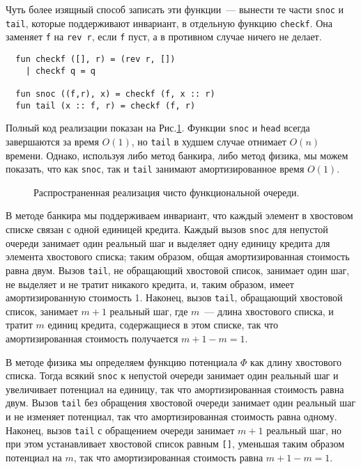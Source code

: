 Чуть более изящный способ записать эти функции~--- вынести те части
\lstinline!snoc! и \lstinline!tail!, которые поддерживают инвариант, в
отдельную функцию \lstinline!checkf!. Она заменяет \lstinline!f! на
\lstinline!rev r!, если \lstinline!f! пуст, а в противном случае
ничего не делает.
\begin{lstlisting}
  fun checkf ([], r) = (rev r, [])
    | checkf q = q

  fun snoc ((f,r), x) = checkf (f, x :: r)
  fun tail (x :: f, r) = checkf (f, r)
\end{lstlisting}
Полный код реализации показан на Рис.\ref{fig:5.2}. Функции
\lstinline!snoc! и \lstinline!head! всегда завершаются за время
$O(1)$, но \lstinline!tail! в худшем случае отнимает $O(n)$
времени. Однако, используя либо метод банкира, либо метод физика, мы
можем показать, что как \lstinline!snoc!, так и \lstinline!tail!
занимают амортизированное время $O(1)$.

\begin{figure}
  \centering
  
  \caption{Распространенная реализация чисто функциональной очереди.}
  \label{fig:5.2}
\end{figure}

В методе банкира мы поддерживаем инвариант, что каждый элемент в
хвостовом списке связан с одной единицей кредита. Каждый вызов
\lstinline!snoc! для непустой очереди занимает один реальный шаг и
выделяет одну единицу кредита для элемента хвостового списка; таким
образом, общая амортизированная стоимость равна двум. Вызов
\lstinline!tail!, не обращающий хвостовой список, занимает один шаг,
не выделяет и не тратит никакого кредита, и, таким образом, имеет
амортизированную стоимость 1. Наконец, вызов \lstinline!tail!,
обращающий хвостовой список, занимает $m+1$ реальный шаг, где $m$~---
длина хвостового списка, и тратит $m$ единиц кредита, содержащиеся в
этом списке, так что амортизированная стоимость получается $m + 1 - m
= 1$.

В методе физика мы определяем функцию потенциала $\Phi$ как длину
хвостового списка. Тогда всякий \lstinline!snoc! к непустой очереди
занимает один реальный шаг и увеличивает потенциал на единицу, так что
амортизированная стоимость равна двум. Вызов \lstinline!tail! без
обращения хвостовой очереди занимает один реальный шаг и не изменяет
потенциал, так что амортизированная стоимость равна одному. Наконец,
вызов \lstinline!tail! с обращением очереди занимает $m+1$ реальный
шаг, но при этом устанавливает хвостовой список равным \lstinline![]!,
уменьшая таким образом потенциал на $m$, так что амортизированная
стоимость равна $m + 1 - m = 1$.

